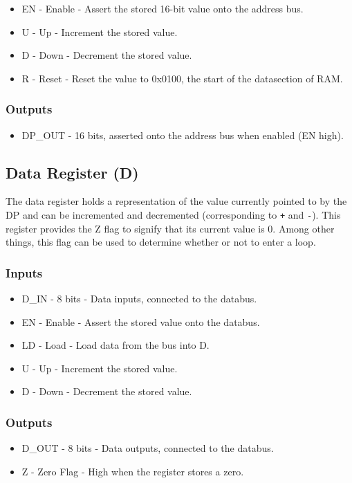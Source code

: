 \begin{itemize}
\itemsep0em 
\item EN - Enable - Assert the stored 16-bit value onto the address bus.
\item U - Up - Increment the stored value.
\item D - Down - Decrement the stored value.
\item R - Reset - Reset the value to 0x0100, the start of the datasection of RAM.
\end{itemize}

\subsubsection*{Outputs}
\begin{itemize}
\itemsep0em   
\item DP\_OUT - 16 bits, asserted onto the address bus when enabled (EN high).
\end{itemize}

\subsection{Data Register (D)} \label{sec:architecture:d}
The data register holds a representation of the value currently pointed to by the DP and can be incremented and decremented (corresponding to \texttt{+} and \texttt{-}). This register provides the Z flag to signify that its current value is 0. Among other things, this flag can be used to determine whether or not to enter a loop.

\subsubsection*{Inputs}
\begin{itemize}
\itemsep0em   
\item D\_IN - 8 bits - Data inputs, connected to the databus.
\item EN - Enable - Assert the stored value onto the databus.
\item LD - Load - Load data from the bus into D.
\item U - Up - Increment the stored value.
\item D - Down - Decrement the stored value.
\end{itemize}

\subsubsection*{Outputs}
\begin{itemize}
\itemsep0em 
\item D\_OUT - 8 bits - Data outputs, connected to the databus.
\item Z - Zero Flag - High when the register stores a zero.
\end{itemize}


